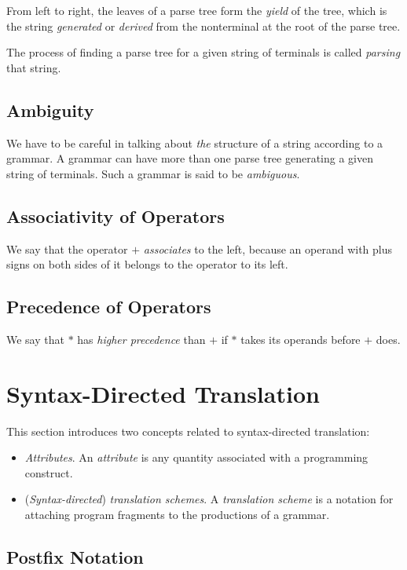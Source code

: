 \documentclass[a4paper,twoside]{book}
\begin{document}
From left to right, the leaves of a parse tree form the \textit{yield} of the tree, which is the string \textit{generated} or \textit{derived} from the nonterminal at the root of the parse tree.

The process of finding a parse tree for a given string of terminals is called \textit{parsing} that string.

\subsection{Ambiguity}

We have to be careful in talking about \textit{the} structure of a string according to a grammar. A grammar can have more than one parse tree generating a given string of terminals. Such a grammar is said to be \textit{ambiguous}.

\subsection{Associativity of Operators}

We say that the operator $+$ \textit{associates} to the left, because an operand with plus signs on both sides of it belongs to the operator to its left.

\subsection{Precedence of Operators}

We say that $*$ has \textit{higher precedence} than $+$ if $*$ takes its operands before $+$ does.

\section{Syntax-Directed Translation}

This section introduces two concepts related to syntax-directed translation:
\begin{itemize}
    \item\textit{Attributes}. An \textit{attribute} is any quantity associated with a programming construct.
    \item(\textit{Syntax-directed}) \textit{translation schemes}. A \textit{translation scheme} is a notation for attaching program fragments to the productions of a grammar.
\end{itemize}

\subsection{Postfix Notation}
\end{document}

